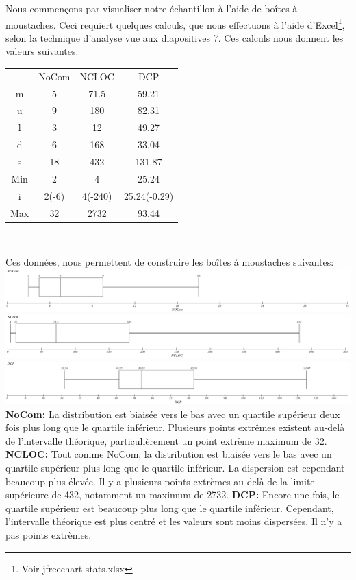 \documentclass{article}
\begin{document}
Nous commençons par visualiser notre échantillon à l'aide de boîtes à moustaches.
Ceci requiert quelques calculs, que nous effectuons à l'aide d'Excel\footnote{Voir jfreechart-stats.xlsx}, selon la technique d'analyse vue aux diapositives 7.
Ces calculs nous donnent les valeurs suivantes:
\begin{center}
\begin{tabular}{ c c c c }
 & NoCom & NCLOC & DCP \\
m & 5 & 71.5 & 59.21\\
u & 9 & 180 & 82.31\\
l & 3 & 12 & 49.27\\
d & 6 & 168 & 33.04\\
s & 18 & 432 & 131.87\\
Min & 2 & 4 & 25.24\\
i & 2(-6) & 4(-240) & 25.24(-0.29)\\
Max & 32 & 2732 & 93.44
\end{tabular}
\\
\end{center}
Ces données, nous permettent de construire les boîtes à moustaches suivantes\footnotemark{}:\newline
{}
\includegraphics[width=\textwidth]{t1nocom.PNG}
\includegraphics[width=\textwidth]{t1ncloc.PNG}
\includegraphics[width=\textwidth]{t1dcp.PNG}
\textbf{NoCom:}
La distribution est biaisée vers le bas avec un quartile supérieur deux fois plus long que le quartile inférieur.
Plusieurs points extrêmes existent au-delà de l'intervalle théorique, particulièrement un point extrème maximum de 32.\newline
\textbf{NCLOC:}
Tout comme NoCom, la distribution est biaisée vers le bas avec un quartile supérieur plus long que le quartile inférieur.
La dispersion est cependant beaucoup plus élevée.
Il y a plusieurs points extrèmes au-delà de la limite supérieure de 432, notamment un maximum de 2732.\newline
\textbf{DCP:}
Encore une fois, le quartile supérieur est beaucoup plus long que le quartile inférieur.
Cependant, l'intervalle théorique est plus centré et les valeurs sont moins dispersées.
Il n'y a pas points extrèmes.
\end{document}
